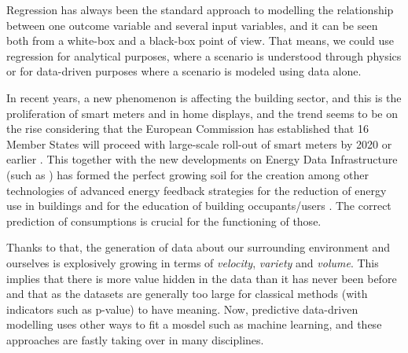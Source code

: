 \documentclass[10pt, conference, compsocconf]{IEEEtran}
\begin{document}

Regression has always been the standard approach to modelling the relationship between one outcome variable  and several input variables, and it can be seen both from a white-box and a black-box point of view. That means, we could use regression for analytical purposes, where a scenario is understood through physics or for data-driven purposes where a scenario is modeled using data alone. 


In recent years, a new phenomenon is affecting the building sector, and this is the proliferation of smart meters and in home displays, and the trend seems to be on the rise considering that the European Commission has established that 16 Member States will proceed with large-scale roll-out of smart meters by 2020 or earlier \cite{ec2014report}. This together with the new developments on Energy Data Infrastructure (such as \cite{terroso2017open}) has formed the perfect growing soil for the creation among other technologies of advanced energy feedback strategies for the reduction of energy use in buildings and for the education of building occupants/users \cite{how2017}. The correct prediction of consumptions is crucial for the functioning of those.

Thanks to that, the generation of data about our surrounding environment and ourselves is explosively growing in terms of \emph{velocity}, \emph{variety} and \emph{volume}. This implies that there is more value hidden in the data than it has never been before and that as the datasets are generally too large for classical methods (with indicators such as p-value) to have meaning. Now, predictive data-driven modelling uses other ways to fit a mosdel such as machine learning, and these approaches are fastly taking over in many disciplines.



\end{document}
